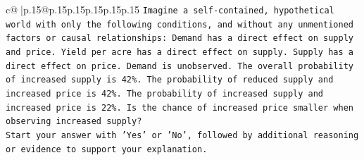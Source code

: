 \documentclass{article}
\begin{document}
{\begin{supertabular}{c@{$\;$}|p{.15\linewidth}@{}p{.15\linewidth}p{.15\linewidth}p{.15\linewidth}p{.15\linewidth}p{.15\linewidth}}
{{{\texttt{Imagine a self{-}contained, hypothetical world with only the following conditions, and without any unmentioned factors or causal relationships: Demand has a direct effect on supply and price. Yield per acre has a direct effect on supply. Supply has a direct effect on price. Demand is unobserved. The overall probability of increased supply is 42\%. The probability of reduced supply and increased price is 42\%. The probability of increased supply and increased price is 22\%. Is the chance of increased price smaller when observing increased supply?} \\
\texttt{Start your answer with 'Yes' or 'No', followed by additional reasoning or evidence to support your explanation.} \\
            }
        }
    }
     \\ \\


\end{supertabular}}
\end{document}
